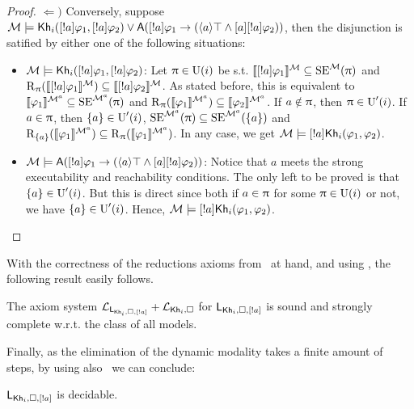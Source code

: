 \begin{proof}
$\Leftarrow)$ Conversely, suppose $\modults \models \khi(\srefbox{a} \varphi_1,\srefbox{a} \varphi_2) \vee \A(\srefbox{a} \varphi_1 \ra (\mldiam{a}\top \wedge \mlbox{a} \srefbox{a}\varphi_2))$, then the disjunction is satified by either one of the following situations:
\begin{itemize}
    \item $\modults \models \khi(\srefbox{a} \varphi_1,\srefbox{a} \varphi_2)$: Let $\plans \in \Unc(i)$ be s.t. $\truthset{\modults}{\srefbox{a}\varphi_1} \subseteq \stexec^\modults(\plans)$ and $\R_\plans(\truthset{\modults}{\srefbox{a}\varphi_1}) \subseteq \truthset{\modults}{\srefbox{a}\varphi_2}$.
    As stated before, this is equivalent to $\truthset{\modults^a}{\varphi_1} \subseteq \stexec^{\modults^a}(\plans)$ and $\R_\plans(\truthset{\modults^a}{\varphi_1}) \subseteq \truthset{\modults^a}{\varphi_2}$.
    If $a \notin \plans$, then $\plans \in \Unc'(i)$.
    If $a \in \plans$, then $\set{a} \in \Unc'(i)$, $\stexec^{\modults^a}(\plans) \subseteq \stexec^{\modults^a}(\set{a})$ and $\R_{\set{a}}(\truthset{\modults^a}{\varphi_1}) \subseteq \R_\plans(\truthset{\modults^a}{\varphi_1})$. In any case, we get $\modults \models \srefbox{a}\khi(\varphi_1,\varphi_2)$.

    \item $\modults \models \A(\srefbox{a} \varphi_1 \ra (\mldiam{a}\top \wedge \mlbox{a} \srefbox{a}\varphi_2))$: Notice that $a$ meets the strong executability and reachability conditions.
    The only left to be proved is that $\set{a} \in \Unc'(i)$. But this is direct since both if $a \in \plans$ for some $\plans \in \Unc(i)$ or not, we have $\set{a} \in \Unc'(i)$. Hence,  $\modults \models \srefbox{a}\khi(\varphi_1,\varphi_2)$.
\end{itemize}
\end{proof}

With the correctness of the reductions axioms from~ at hand, and using , the following result easily follows.

\medskip 

\begin{theorem}\label{th:sscomplete}
The axiom system $\axset_{\AtomReflogic}+\axset_{\khi,\square}$ for $\AtomReflogic$ is sound and strongly complete w.r.t. the class of all models.
\end{theorem}

\medskip 

Finally, as the elimination of the dynamic modality takes a finite amount of steps, by using also~ we can conclude:

\medskip 

\begin{corollary}
$\AtomReflogic$ is decidable.
\end{corollary} 
